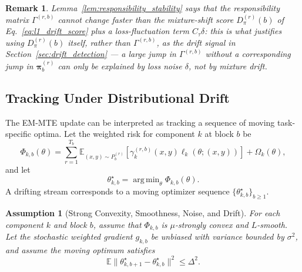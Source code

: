 ﻿\documentclass[12pt,a4paper]{article}
\newtheorem{assumption}{Assumption}
\newtheorem{remark}{Remark}
\DeclareMathOperator*{\argmin}{arg\,min}
\newcommand{\E}{\mathbb{E}}
\begin{document}
\begin{remark}
Lemma~\ref{lem:responsibility_stability} says that the responsibility
matrix $\Gamma^{(r,b)}$ cannot change faster than the mixture-shift score
$D_\pi^{(r)}(b)$ of Eq.~\eqref{eq:l1_drift_score} plus a
loss-fluctuation term $C_\tau\delta$: this is what justifies using
$D_\pi^{(r)}(b)$ itself, rather than $\Gamma^{(r,b)}$, as the drift signal
in Section~\ref{sec:drift_detection} — a large jump in $\Gamma^{(r,b)}$
without a corresponding jump in $\bm\pi_b^{(r)}$ can only be explained by
loss noise $\delta$, not by mixture drift.
\end{remark}

\subsection{Tracking Under Distributional Drift}
The EM-MTE update can be interpreted as tracking a sequence of moving
task-specific optima. Let the weighted risk for component $k$ at block $b$
be
\begin{equation}
\Phi_{k,b}(\theta)=
\sum_{r=1}^{T_b}\E_{(x,y)\sim P_b^{(r)}}
\left[\gamma_k^{(r,b)}(x,y)\ell_k(\theta;(x,y))\right]+\Omega_k(\theta),
\end{equation}
and let
\begin{equation}
\theta_{k,b}^{\star}=\argmin_{\theta}\Phi_{k,b}(\theta).
\end{equation}
A drifting stream corresponds to a moving optimizer sequence
$\{\theta_{k,b}^{\star}\}_{b\geq1}$.

\begin{assumption}[Strong Convexity, Smoothness, Noise, and Drift]
\label{as:scx_drift}
For each component $k$ and block $b$, assume that $\Phi_{k,b}$ is
$\mu$-strongly convex and $L$-smooth. Let the stochastic weighted gradient
$g_{k,b}$ be unbiased with variance bounded by $\sigma^2$, and assume the
moving optimum satisfies
\begin{equation}
\E\|\theta_{k,b+1}^{\star}-\theta_{k,b}^{\star}\|^2\leq\Delta^2.
\end{equation}
\end{assumption}
\end{document}
